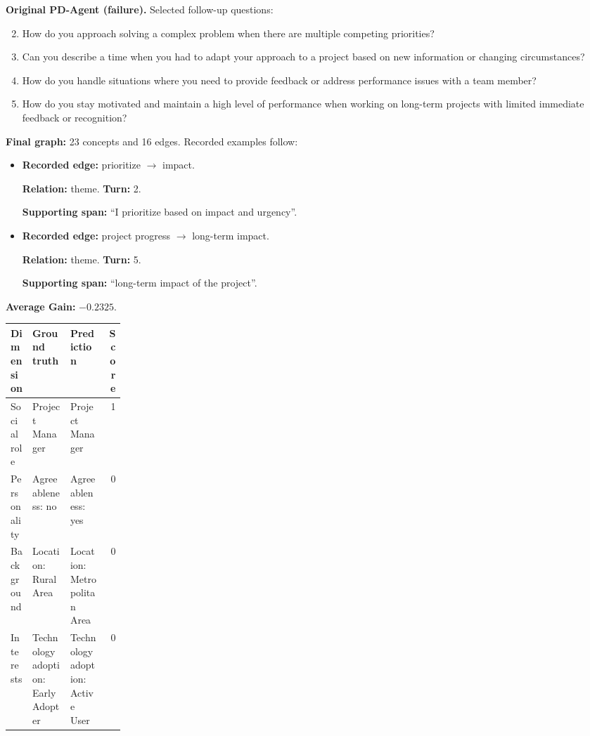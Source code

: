 \documentclass{ieeeaccess}
\begin{document}
\begin{multicols*}{2}
\begin{samepage}
\noindent\textbf{Original PD-Agent (failure).} Selected follow-up questions:\par\nopagebreak[4]
\begin{enumerate}
\setcounter{enumi}{1}
\item How do you approach solving a complex problem when there are multiple competing priorities?
\item Can you describe a time when you had to adapt your approach to a project based on new information or changing circumstances?
\item How do you handle situations where you need to provide feedback or address performance issues with a team member?
\item How do you stay motivated and maintain a high level of performance when working on long-term projects with limited immediate feedback or recognition?
\end{enumerate}
\end{samepage}
\noindent\begin{minipage}{\linewidth}
\noindent\textbf{Final graph:} 23 concepts and 16 edges. Recorded examples follow:
\begin{itemize}
\item \textbf{Recorded edge:} prioritize $\rightarrow$ impact.
\par\textbf{Relation:} theme. \textbf{Turn:} 2.
\par\textbf{Supporting span:} ``I prioritize based on impact and urgency''.
\item \textbf{Recorded edge:} project progress $\rightarrow$ long-term impact.
\par\textbf{Relation:} theme. \textbf{Turn:} 5.
\par\textbf{Supporting span:} ``long-term impact of the project''.
\end{itemize}
\end{minipage}\par\smallskip
\noindent\begin{minipage}{\linewidth}
\noindent\textbf{Average Gain:} $-0.2325$.\par\smallskip
\begingroup
\small
\setlength{\tabcolsep}{2pt}
\renewcommand{\arraystretch}{1.12}
\noindent\begin{tabularx}{\linewidth}{@{}p{0.19\linewidth}>{\raggedright\arraybackslash}X>{\raggedright\arraybackslash}Xr@{}}
\toprule
Dimension & Ground truth & Prediction & Score \\
\midrule
Social role & Project Manager & Project Manager & 1 \\
\addlinespace[2pt]
Personality & Agreeableness: no & Agreeableness: yes & 0 \\
\addlinespace[2pt]
Background & Location: Rural Area & Location: Metropolitan Area & 0 \\
\addlinespace[2pt]
Interests & Technology adoption: Early Adopter & Technology adoption: Active User & 0 \\
\bottomrule
\end{tabularx}\par
\endgroup
\end{minipage}\par\medskip


\end{multicols*}
\end{document}
